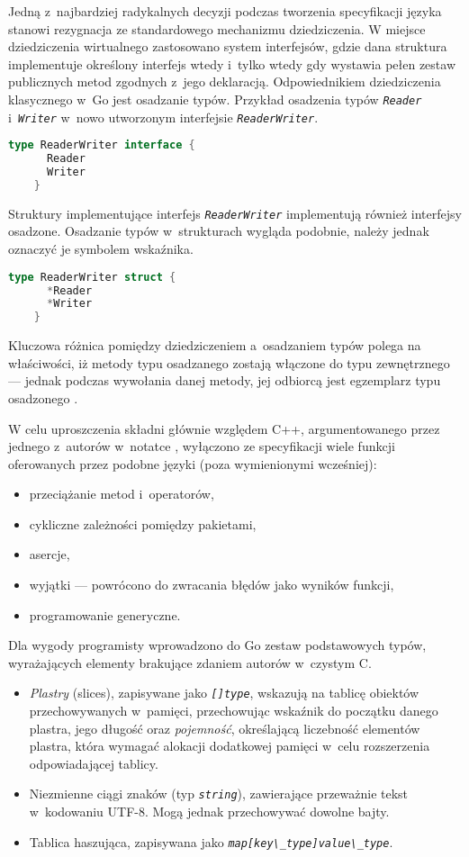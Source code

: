   \par{
  Jedną z~najbardziej radykalnych decyzji podczas tworzenia specyfikacji języka stanowi rezygnacja ze standardowego mechanizmu dziedziczenia. W miejsce dziedziczenia wirtualnego zastosowano system interfejsów, gdzie dana struktura implementuje określony interfejs wtedy i~tylko wtedy gdy wystawia pełen zestaw publicznych metod zgodnych z~jego deklaracją. Odpowiednikiem dziedziczenia klasycznego w~Go jest osadzanie typów.
  Przykład osadzenia typów \textit{\lstinline{Reader}} i~\textit{\lstinline{Writer}} w~nowo utworzonym interfejsie \textit{\lstinline{ReaderWriter}}.
  \begin{lstlisting}[language=go]
    type ReaderWriter interface {
      Reader
      Writer
    }
  \end{lstlisting}
  Struktury implementujące interfejs \textit{\lstinline{ReaderWriter}} implementują również interfejsy osadzone.
  Osadzanie typów w~strukturach wygląda podobnie, należy jednak oznaczyć je symbolem wskaźnika.
  \begin{lstlisting}[language=go]
    type ReaderWriter struct {
      *Reader
      *Writer
    }
  \end{lstlisting}
  Kluczowa różnica pomiędzy dziedziczeniem a~osadzaniem typów polega na właściwości, iż metody typu osadzanego zostają włączone do typu zewnętrznego --- jednak podczas wywołania danej metody, jej odbiorcą jest egzemplarz typu osadzonego \cite{godoc:embedding}.
}
\par {
W celu uproszczenia składni głównie względem C++, argumentowanego przez jednego z~autorów w~notatce \cite{Pike:LessIsMore}, wyłączono ze specyfikacji wiele funkcji oferowanych przez podobne języki (poza wymienionymi wcześniej):
  \begin{itemize}
    \item przeciążanie metod i~operatorów,
    \item cykliczne zależności pomiędzy pakietami,
    \item asercje,
    \item wyjątki --- powrócono do zwracania błędów jako wyników funkcji,
    \item programowanie generyczne.
  \end{itemize}
}
\par{
  Dla wygody programisty wprowadzono do Go zestaw podstawowych typów, wyrażających elementy brakujące zdaniem autorów w~czystym C.
  \begin{itemize}
    \item \emph{Plastry} (slices), zapisywane jako \textit{\lstinline{[]type}}, wskazują na tablicę obiektów przechowywanych w~pamięci, przechowując wskaźnik do początku danego plastra, jego długość oraz \emph{pojemność}, określającą liczebność elementów plastra, która wymagać alokacji dodatkowej pamięci w~celu rozszerzenia odpowiadającej tablicy.
    \item Niezmienne ciągi znaków (typ \textit{\lstinline{string}}), zawierające przeważnie tekst w~kodowaniu UTF-8. Mogą jednak przechowywać dowolne bajty.
    \item Tablica haszująca, zapisywana jako \textit{\lstinline{map[key\_type]value\_type}}.
  \end{itemize}
}
